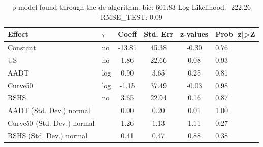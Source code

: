 \begin{table}
	\caption{p model found through the de algorithm. bic: 601.83 Log-Likelihood: -222.26 RMSE_TEST: 0.09}
	\begin{center}
		\begin{tabular}{|l|l|c|c|c|l|}
			\hline
			Effect & $\tau$ & Coeff & Std. Err & z-values & Prob |z|>Z \\
			\hline
			Constant & no & -13.81 & 45.38 & -0.30 & 0.76 \\
			\hline
			US & no & 1.86 & 22.66 & 0.08 & 0.93 \\
			\hline
			AADT & log & 0.90 & 3.65 & 0.25 & 0.81 \\
			\hline
			Curve50 & log & -1.15 & 37.49 & -0.03 & 0.98 \\
			\hline
			RSHS & no & 3.65 & 22.94 & 0.16 & 0.87 \\
			\hline
			AADT (Std. Dev.) normal &  & 0.00 & 0.20 & 0.01 & 1.00 \\
			\hline
			Curve50 (Std. Dev.) normal &  & 1.26 & 1.13 & 1.11 & 0.27 \\
			\hline
			RSHS (Std. Dev.) normal &  & 0.41 & 0.47 & 0.88 & 0.38 \\
			\hline
		\end{tabular}
	\end{center}
\end{table}